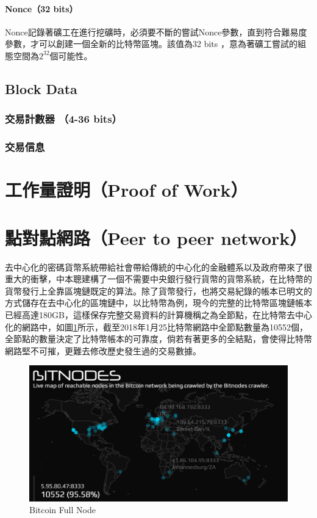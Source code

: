 			\paragraph{Nonce（32 bits）}Nonce記錄著礦工在進行挖礦時，必須要不斷的嘗試Nonce參數，直到符合難易度參數，才可以創建一個全新的比特幣區塊。該值為32 bits ，意為著礦工嘗試的組態空間為$2^{32}$個可能性。


		\subsection{Block Data}
			\subsubsection{交易計數器 （4-36 bits）}
			\subsubsection{交易信息}

	\section{工作量證明（Proof of Work）}
	\section{點對點網路（Peer to peer network）}

	去中心化的密碼貨幣系統帶給社會帶給傳統的中心化的金融體系以及政府帶來了很重大的衝擊，中本聰建構了一個不需要中央銀行發行貨幣的貨幣系統，在比特幣的貨幣發行上全靠區塊鏈既定的算法。除了貨幣發行，也將交易紀錄的帳本已明文的方式儲存在去中心化的區塊鏈中，以比特幣為例，現今的完整的比特幣區塊鏈帳本已經高達180GB，這樣保存完整交易資料的計算機稱之為全節點，在比特幣去中心化的網路中，如圖\ref{bitcoinfullnode}所示，截至2018年1月25比特幣網路中全節點數量為10552個\parencite{bitcoinfullnode}，全節點的數量決定了比特幣帳本的可靠度，倘若有著更多的全結點，會使得比特幣網路堅不可摧，更難去修改歷史發生過的交易數據。

	\begin{figure}
		\centering
		\includegraphics[width = .9\textwidth]{bitcoinfullnode.png}
		\caption{Bitcoin Full Node\parencite{bitcoinfullnode}}\label{bitcoinfullnode}
	\end{figure}

